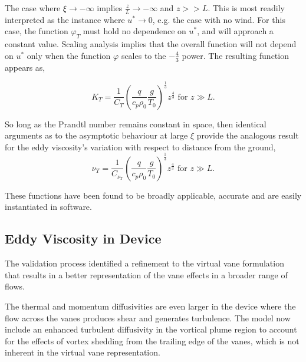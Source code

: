 The case where $\xi \to -\infty $ implies $\frac{z}{L} \to
-\infty $ and $z>>L$. This is most readily interpreted as the instance
where $u^* \to 0$, e.g. the case with no wind. For this case, the
function $\varphi_T$ must hold no dependence on $u^*$, and will approach
a constant value. Scaling analysis implies that the overall function
will not depend on $u^*$ only when the function $\varphi$ scales to the
$-\frac{4}{3}$ power. The resulting function appears as, 

\begin{equation}
 K_T = \frac{1}{C_T} \left( \frac{q}{c_p \rho_0} \frac{g}{T_0}
		     \right)^\frac{1}{3} z^{\frac{4}{3}}  \text{ 
for } z \gg L. 
\end{equation}

So long as the Prandtl number remains constant in space, then
identical arguments as to the asymptotic behaviour at large $\xi$ provide
the analogous result for the eddy viscosity's variation with respect to
distance from the ground,  
\begin{equation}
 \nu_T = \frac{1}{C_{\nu_T}} \left( \frac{q}{c_p \rho_0} \frac{g}{T_0}
			     \right)^\frac{1}{3} z^{\frac{4}{3}}  \text{ 
for } z \gg L. 
\end{equation}

These functions have been found to be broadly applicable, accurate and 
are easily instantiated in software. 

\subsection{Eddy Viscosity in Device}

The validation process identified a refinement to the virtual vane
formulation that results in a better representation of the vane
effects in a broader range of flows. 

The thermal and momentum diffusivities are even larger in the
device where the flow across the vanes produces shear and generates
turbulence. The model now include an enhanced turbulent diffusivity in
the vortical plume region to account for the effects of vortex shedding
from the trailing edge of the vanes, which is not inherent in the
virtual vane representation.   


